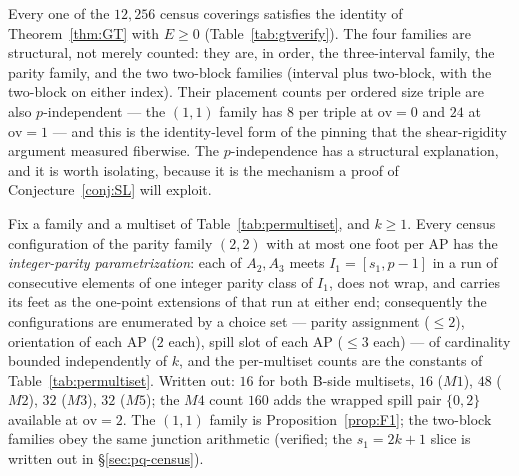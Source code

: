 Every one of the $12{,}256$ census coverings satisfies the identity of
Theorem~\ref{thm:GT} with $E\ge0$ (Table~\ref{tab:gtverify}). The four
families are structural, not merely counted: they are, in order, the
three-interval family, the parity family, and the two two-block families
(interval plus two-block, with the two-block on either index). Their
placement counts per ordered size triple are also $p$-independent --- the
$(1,1)$ family has $8$ per triple at $\mathrm{ov}=0$ and $24$ at
$\mathrm{ov}=1$ --- and this is the identity-level form of the pinning that
the shear-rigidity argument measured fiberwise. The $p$-independence has a
structural explanation, and it is worth isolating, because it is the
mechanism a proof of Conjecture~\ref{conj:SL} will exploit.

\begin{proposition}\label{prop:pindep}
Fix a family and a multiset of Table~\ref{tab:permultiset}, and $k\ge1$.
Every census configuration of the parity family $(2,2)$ with at most one
foot per AP has the \emph{integer-parity parametrization}: each of $A_2,
A_3$ meets $I_1=[s_1,p-1]$ in a run of consecutive elements of one integer
parity class of $I_1$, does not wrap, and carries its feet as the one-point
extensions of that run at either end; consequently the configurations are
enumerated by a choice set --- parity assignment ($\le2$), orientation of
each AP ($2$ each), spill slot of each AP ($\le3$ each) --- of cardinality
bounded independently of $k$, and the per-multiset counts are the constants
of Table~\ref{tab:permultiset}. Written out: $16$ for both B-side
multisets, $16$ ($M1$), $48$ ($M2$), $32$ ($M3$), $32$ ($M5$); the $M4$
count $160$ adds the wrapped spill pair $\{0,2\}$ available at
$\mathrm{ov}=2$. The $(1,1)$ family is Proposition~\ref{prop:F1}; the
two-block families obey the same junction arithmetic (verified; the
$s_1=2k{+}1$ slice is written out in \S\ref{sec:pq-census}).
\end{proposition}

